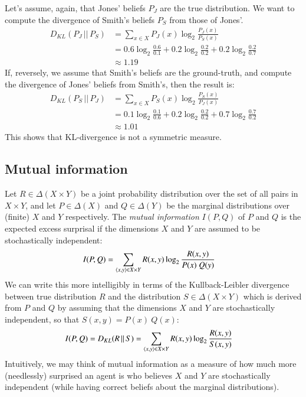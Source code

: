 \documentclass[nobib,nofonts]{tufte-handout}
\begin{document}
\begin{example}
  Let's assume, again, that Jones' beliefs $P_{J}$ are the true distribution.
  We want to compute the divergence of Smith's beliefs $P_{S}$ from those of Jones'.
  \begin{align*}
    D_{KL}(P_{J} \,||\, P_{S}) & = \sum_{x \in X} P_{J}(x) \log_{2}  \frac{P_{J}(x)}{P_{S}(x)} \\
                               & = 0.6 \log_{2} \frac{0.6}{0.1} +
                                 0.2 \log_{2} \frac{0.2}{0.2} +
                                 0.2 \log_{2} \frac{0.2}{0.7} \\
    & \approx 1.19
  \end{align*}
  If, reversely, we assume that Smith's beliefs are the ground-truth, and compute the divergence of Jones' beliefs from Smith's, then the result is:
  \begin{align*}
    D_{KL}(P_{S} \,||\, P_{J}) & = \sum_{x \in X} P_{S}(x) \log_{2}  \frac{P_{S}(x)}{P_{J}(x)} \\
                               & = 0.1 \log_{2} \frac{0.1}{0.6} +
                                   0.2 \log_{2} \frac{0.2}{0.2} +
                                   0.7 \log_{2} \frac{0.7}{0.2} \\
    & \approx 1.01
  \end{align*}
  This shows that KL-divergence is not a symmetric measure.
\end{example}


\subsection{Mutual information}

Let $R \in \Delta(X \times Y)$ be a joint probability distribution over the set of all pairs in $X \times Y$, and let $P \in \Delta(X)$ and $Q \in \Delta(Y)$ be the marginal distributions over (finite) $X$ and $Y$ respectively.
The \emph{mutual information} $I(P,Q)$ of $P$ and $Q$ is the expected excess surprisal if the dimensions $X$ and $Y$ are assumed to be stochastically independent:
\begin{align*}
  I(P,Q) & = \sum_{\left \langle x,y\right\rangle \in X \times Y} R(x,y) \log_{2} \frac{R(x,y)}{P(x) \ Q(y)}
\end{align*}
We can write this more intelligibly in terms of the Kullback-Leibler divergence between true distribution $R$ and the distribution $S \in \Delta(X \times Y)$ which is derived from $P$ and $Q$ by assuming that the dimensions $X$ and $Y$ are stochastically independent, so that $S(x,y) = P(x) \ Q(x)$:
\begin{align*}
  I(P,Q) & =  D_{KL}(R \,||\, S) = \sum_{\left \langle x,y\right\rangle \in X \times Y} R(x,y) \log_{2} \frac{R(x,y)}{S(x,y)}
\end{align*}
Intuitively, we may think of mutual information as a measure of how much more (needlessly) surprised an agent is who believes $X$ and $Y$ are stochastically independent (while having correct beliefs about the marginal distributions).
\end{document}
